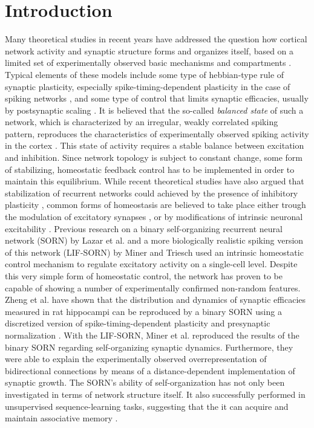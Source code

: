 \documentclass[10pt,letterpaper]{article}
\begin{document}
\linenumbers

\section*{Introduction}
Many theoretical studies in recent years have addressed the question how cortical network activity and synaptic structure forms and organizes itself, based on a limited set of experimentally observed basic mechanisms and compartments \cite{Lazar_2009,Savin_2010,Tetzlaff_2012,Effenberger_2015}. Typical elements of these models include some type of hebbian-type rule of synaptic plasticity, especially spike-timing-dependent plasticity in the case of spiking networks \cite{Zhang_STDP}, and some type of control that limits synaptic efficacies, usually by postsynaptic scaling \cite{Turrigiano_2008}. It is believed that the so-called \textit{balanced state} of such a network, which is characterized by an irregular, weakly correlated spiking pattern, reproduces the characteristics of experimentally observed spiking activity in the cortex \cite{Haider_2006}. This state of activity requires a stable balance between excitation and inhibition. Since network topology is subject to constant change, some form of stabilizing, homeostatic feedback control has to be implemented in order to maintain this equilibrium. While recent theoretical studies have also argued that stabilization of recurrent networks could achieved by the presence of inhibitory plasticity \cite{Vogels_2011}, common forms of homeostasis are believed to take place either trough the modulation of excitatory synapses \cite{Syn_Plast_Abbott}, or by modifications of intrinsic neuronal excitability \cite{LeMasson_1993}. Previous research on a binary self-organizing recurrent neural network (SORN) by Lazar et al. \cite{Lazar_2009} and a more biologically realistic spiking version of this network (LIF-SORN) by Miner and Triesch \cite{SORN_Paper} used an intrinsic homeostatic control mechanism to regulate excitatory activity on a single-cell level. Despite this very simple form of homeostatic control, the network has proven to be capable of showing a number of experimentally confirmed non-random features. Zheng et al. have shown that the distribution and dynamics of synaptic efficacies measured in rat hippocampi can be reproduced by a binary SORN using a discretized version of spike-timing-dependent plasticity and presynaptic normalization \cite{Pengsheng_2013}. With the LIF-SORN, Miner et al. reproduced the results of the binary SORN regarding self-organizing synaptic dynamics. Furthermore, they were able to explain the experimentally observed overrepresentation of bidirectional connections \cite{Markram_Connections_1997,Song_Connectivity_2005} by means of a distance-dependent implementation of synaptic growth. The SORN's ability of self-organization has not only been investigated in terms of network structure itself. It also successfully performed in unsupervised sequence-learning tasks, suggesting that the it can acquire and maintain associative memory \cite{Hartmann_2016}.
\end{document}
